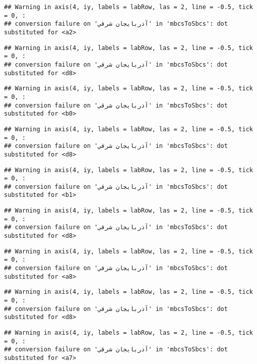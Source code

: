 \documentclass[
]{article}
\begin{document}
\begin{verbatim}
## Warning in axis(4, iy, labels = labRow, las = 2, line = -0.5, tick = 0, :
## conversion failure on 'آذربايجان شرقي' in 'mbcsToSbcs': dot substituted for <a2>
\end{verbatim}

\begin{verbatim}
## Warning in axis(4, iy, labels = labRow, las = 2, line = -0.5, tick = 0, :
## conversion failure on 'آذربايجان شرقي' in 'mbcsToSbcs': dot substituted for <d8>
\end{verbatim}

\begin{verbatim}
## Warning in axis(4, iy, labels = labRow, las = 2, line = -0.5, tick = 0, :
## conversion failure on 'آذربايجان شرقي' in 'mbcsToSbcs': dot substituted for <b0>
\end{verbatim}

\begin{verbatim}
## Warning in axis(4, iy, labels = labRow, las = 2, line = -0.5, tick = 0, :
## conversion failure on 'آذربايجان شرقي' in 'mbcsToSbcs': dot substituted for <d8>
\end{verbatim}

\begin{verbatim}
## Warning in axis(4, iy, labels = labRow, las = 2, line = -0.5, tick = 0, :
## conversion failure on 'آذربايجان شرقي' in 'mbcsToSbcs': dot substituted for <b1>
\end{verbatim}

\begin{verbatim}
## Warning in axis(4, iy, labels = labRow, las = 2, line = -0.5, tick = 0, :
## conversion failure on 'آذربايجان شرقي' in 'mbcsToSbcs': dot substituted for <d8>
\end{verbatim}

\begin{verbatim}
## Warning in axis(4, iy, labels = labRow, las = 2, line = -0.5, tick = 0, :
## conversion failure on 'آذربايجان شرقي' in 'mbcsToSbcs': dot substituted for <a8>
\end{verbatim}

\begin{verbatim}
## Warning in axis(4, iy, labels = labRow, las = 2, line = -0.5, tick = 0, :
## conversion failure on 'آذربايجان شرقي' in 'mbcsToSbcs': dot substituted for <d8>
\end{verbatim}

\begin{verbatim}
## Warning in axis(4, iy, labels = labRow, las = 2, line = -0.5, tick = 0, :
## conversion failure on 'آذربايجان شرقي' in 'mbcsToSbcs': dot substituted for <a7>
\end{verbatim}
\end{document}
